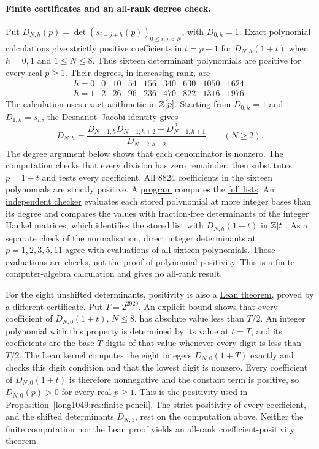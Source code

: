 \documentclass[11pt]{article}
\newcommand{\latecommit}{035c414b25fda09ae0d2e56358b8716d321ebd99}
\newcommand{\laterepobase}{https://github.com/wcook04/plectis-erdos/blob/\latecommit}
\begin{document}
\paragraph{Finite certificates and an all-rank degree check.}
Put $D_{N,h}(p)=\det(s_{i+j+h}(p))_{0\le i,j<N}$, with $D_{0,h}=1$.
Exact polynomial calculations give strictly positive coefficients in
$t=p-1$ for $D_{N,h}(1+t)$ when $h=0,1$ and $1\le N\le8$.
Thus sixteen determinant polynomials are positive for every real $p\ge1$.
Their degrees, in increasing rank, are
\[
\begin{array}{c|rrrrrrrr}
h=0&0&10&54&156&340&630&1050&1624\\
h=1&2&26&96&236&470&822&1316&1976.
\end{array}
\]
The calculation uses exact arithmetic in $\mathbb{Z}[p]$. Starting from
$D_{0,h}=1$ and $D_{1,h}=s_h$, the Desnanot--Jacobi identity gives
\[
 D_{N,h}=
 \frac{D_{N-1,h}D_{N-1,h+2}-D_{N-1,h+1}^{\,2}}{D_{N-2,h+2}}
 \qquad(N\ge2).
\]
The degree argument below shows that each denominator is nonzero.
The computation checks that every division has zero remainder, then
substitutes $p=1+t$ and tests every coefficient. All $8824$ coefficients
in the sixteen polynomials are strictly positive. A
\href{https://github.com/wcook04/plectis-erdos/blob/4beca4ad0c00a626def9c73f2420e20ebf8d1968/computations/finite_coefficients_generate.py}{program}
computes the
\href{https://github.com/wcook04/plectis-erdos/blob/4beca4ad0c00a626def9c73f2420e20ebf8d1968/computations/finite_coefficients.json}{full lists}.
An
\href{https://github.com/wcook04/plectis-erdos/blob/4beca4ad0c00a626def9c73f2420e20ebf8d1968/computations/check_finite_coefficients.py}{independent checker}
evaluates each stored polynomial at more integer bases than its degree and
compares the values with fraction-free determinants of the integer Hankel
matrices, which identifies the stored list with $D_{N,h}(1+t)$ in $\mathbb{Z}[t]$.
As a separate check of the normalisation, direct integer determinants
at $p=1,2,3,5,11$ agree with evaluations of all sixteen polynomials.
Those evaluations are checks, not the proof of polynomial positivity.
This is a finite computer-algebra calculation and gives no all-rank result.

For the eight unshifted determinants, positivity is also a
\href{\laterepobase/lean/ErdosProblems/Erdos1049/PaperR20/HankelKroneckerCertificate.lean\#L458}{Lean theorem},
proved by a different certificate. Put $T=2^{2929}$. An explicit bound
shows that every coefficient of $D_{N,0}(1+t)$, $N\le8$, has absolute
value less than $T/2$. An integer polynomial with this property is
determined by its value at $t=T$, and its coefficients are the base-$T$
digits of that value whenever every digit is less than $T/2$. The Lean
kernel computes the eight integers $D_{N,0}(1+T)$ exactly and checks this
digit condition and that the lowest digit is nonzero. Every coefficient
of $D_{N,0}(1+t)$ is therefore nonnegative and the constant term is
positive, so $D_{N,0}(p)>0$ for every real $p\ge1$. This is the positivity
used in Proposition~\ref{long1049:res:finite-pencil}. The strict
positivity of every coefficient, and the shifted determinants $D_{N,1}$,
rest on the computation above.
Neither the finite computation nor the Lean proof yields an all-rank
coefficient-positivity theorem.
\end{document}
